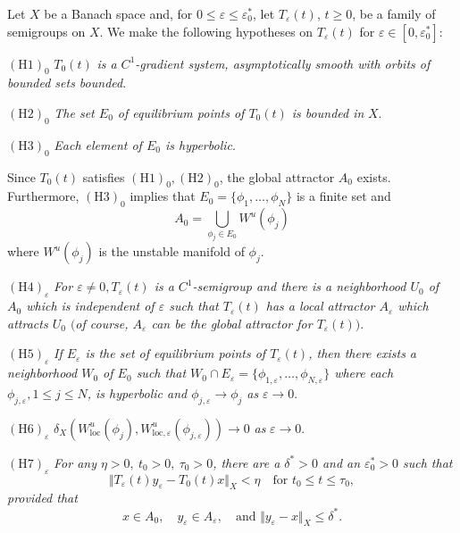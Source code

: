 \documentclass{surv-l}
\theoremstyle{plain}
\theoremstyle{definition}
\numberwithin{equation}{section}
\numberwithin{figure}{chapter}
\begin{document}
Let $X$ be a Banach space and, for $0\leq\varepsilon\leq\varepsilon_{0}^{\ast}$, let $T_{\varepsilon}(t)$, $t\geq 0$, be a family of semigroups on $X$. We make the following hypotheses on $T_{\varepsilon}(t)$ for $\varepsilon \in[0,\varepsilon_{0}^{\ast}]$:

$\mathrm{(H1)}_{0}$ $T_{0}(t)$ \emph{is a $C^{1}$-gradient system, asymptotically smooth with orbits of bounded sets bounded}.

$\mathrm{(H2)}_{0}$ \emph{The set $E_{0}$ of equilibrium points of $T_{0}(t)$ is bounded in} $X$.

$\mathrm{(H3)}_{0}$ \emph{Each element of $E_{0}$ is hyperbolic}.

Since $T_{0}(t)$ satisfies $\mathrm{(H1)}_{0},\mathrm{(H2)}_{0}$, the global attractor $A_{0}$ exists. Furthermore, $\mathrm{(H3)}_{0}$ implies that $E_{0}=\{\phi_{1},\ldots,\phi_{N}\}$ is a finite set and
\begin{equation*}
A_{0}=\bigcup_{\phi_{j}\in E_{0}}W^{u}(\phi_{j})
\end{equation*}
where $W^{u}(\phi_{j})$ is the unstable manifold of $\phi_{j}$.

$\mathrm{(H4)}_{\varepsilon}$ \emph{For $\varepsilon\neq 0,T_{\varepsilon}(t)$ is a $C^{1}$-semigroup and there is a neighborhood $U_{0}$ of $A_{0}$ which is independent of $\varepsilon$ such that $T_{\varepsilon}(t)$ has a local attractor $A_{\varepsilon}$ which attracts $U_{0}$ $($of course, $A_{\varepsilon}$ can be the global attractor for $T_{\varepsilon}(t))$}.

$\mathrm{(H5)}_{\varepsilon}$ \emph{If $E_{\varepsilon}$ is the set of equilibrium points of $T_{\varepsilon}(t)$, then there exists a neighborhood $W_{0}$ of $E_{0}$ such that $W_{0}\cap E_{\varepsilon}=\{\phi_{1,\varepsilon},\ldots, \phi_{N,\varepsilon}\}$ where each $\phi_{j,\varepsilon},1\leq j\leq N$, is hyperbolic and $\phi_{j,\varepsilon}\rightarrow\phi_{j}$ as} $\varepsilon \rightarrow 0$.

$\mathrm{(H6)}_{\varepsilon}$ $\delta_{X}(W_{\mathrm{loc}}^{u}(\phi_{j}),W_{\mathrm{loc},\varepsilon}^{u}(\phi_{j,\varepsilon}))\rightarrow 0$ \emph{as} $\varepsilon \rightarrow 0$.

$\mathrm{(H7)}_{\varepsilon}$ \emph{For any $\eta>0,\ t_{0}>0,\ \tau_{0}>0$, there are a $\delta^{\ast}>0$ and an $\varepsilon_{0}^{\ast}>0$ such that}
\begin{equation*}
\Vert T_{\varepsilon}(t)y_{\varepsilon}-T_{0}(t)x\Vert_{X}<\eta\quad \text{for } t_{0}\leq t\leq\tau_{0},
\end{equation*}
\emph{provided that}
\begin{equation*}
x\in A_{0},\quad y_{\varepsilon}\in A_{\varepsilon},\quad \text{and } \Vert y_{\varepsilon}-x\Vert_{X}\leq\delta^{\ast}.
\end{equation*}
\end{document}
